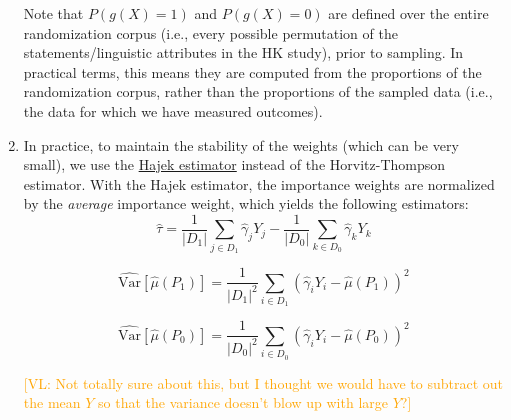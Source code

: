 \documentclass{article}
\newcommand{\vl}[1]{\textcolor{orange}{[VL: #1]}}
\begin{document}
\begin{enumerate}
    Note that $P(g(X)=1)$ and $P(g(X)=0)$ are defined over the entire randomization corpus (i.e., every possible permutation of the statements/linguistic attributes in the HK study), prior to sampling. In practical terms, this means they are computed from the  proportions of the randomization corpus, rather than the  proportions of the sampled data (i.e., the data for which we have measured outcomes).
    \item In practice, to maintain the stability of the weights (which can be very small), we use the \href{https://cran.r-project.org/web/packages/sampling/vignettes/HT_Hajek_estimators.pdf}{Hajek estimator} instead of the Horvitz-Thompson estimator. With the Hajek estimator, the importance weights are normalized by the \textit{average} importance weight, which yields the following estimators:
    \begin{equation*}
        \hat{\tau} = \frac{1}{|D_1|} \sum_{j \in D_1} \hat{\gamma}_j Y_j - \frac{1}{|D_0|} \sum_{k \in D_0} \hat{\gamma}_k Y_k
    \end{equation*}
    

    \begin{equation*}
        \widehat{\text{Var}}[\hat{\mu}(P_1)] = \frac{1}{|D_1|^2} \sum_{i \in D_1} (\hat{\gamma}_i Y_i-\hat{\mu}(P_1))^2
    \end{equation*}
    

    \begin{equation*}
        \widehat{\text{Var}}[\hat{\mu}(P_0)] = \frac{1}{|D_0|^2} \sum_{i \in D_0} (\hat{\gamma}_i Y_i-\hat{\mu}(P_0))^2
    \end{equation*}

    \vl{Not totally sure about this, but I thought we would have to subtract out the mean $Y$ so that the variance doesn't blow up with large $Y$?}
    

\end{enumerate}
\end{document}
